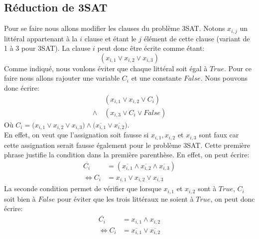 \documentclass[a4paper,11pt]{article}
\begin{document}
  \subsection{Réduction de 3SAT}
    Pour se faire nous allons modifier les clauses du problème 3SAT.  Notons $x_{i, j}$ un littéral appartenant à la $i$ clause et étant le $j$ élément de cette clause (variant de 1 à 3 pour 3SAT).  La clause $i$ peut donc être écrite comme étant:
    $$(x_{i, 1} \vee x_{i, 2} \vee x_{i, 3})$$
    Comme indiqué, nous voulons éviter que chaque littéral soit égal à $True$.  Pour ce faire nous allons rajouter une variable $C_i$ et une constante $False$.  Nous pouvons donc écrire:
    \begin{align*}
    &(x_{i, 1} \vee x_{i, 2} \vee C_i)\\
    \wedge\ &(x_{i, 3} \vee C_i \vee False)
    \end{align*}
    Où $C_i = \big(x_{i, 1} \vee x_{i, 2} \vee x_{i, 3}\big) \wedge \big(\overline{x_{i, 1}} \vee \overline{x_{i, 2}}\big)$.\\
    En effet, on veut que l'assignation soit fausse si $x_{i, 1}, x_{i, 2}$ et $x_{i, 3}$ sont faux car cette assignation serait fausse également pour le problème 3SAT.  Cette première phrase justifie la condition dans la première parenthèse.  En effet, on peut écrire:
    \begin{align*}
      \overline{C_i} &= (\overline{x_{i, 1}} \wedge \overline{x_{i, 2}} \wedge \overline{x_{i, 3}})\\
      \Leftrightarrow C_i &= x_{i, 1} \vee x_{i, 2} \vee x_{i, 3}
    \end{align*}
    La seconde condition permet de vérifier que lorsque $x_{i, 1}$ et $x_{i, 2}$ sont à $True$, $C_i$ soit bien à $False$ pour éviter que les trois littéraux ne soient à $True$, on peut donc écrire:
    \begin{align*}
      \overline{C_i} &= x_{i, 1} \wedge x_{i, 2}\\
      \Leftrightarrow C_i &= \overline{x_{i, 1}} \vee \overline{x_{i, 2}}
    \end{align*}
  
\end{document}

